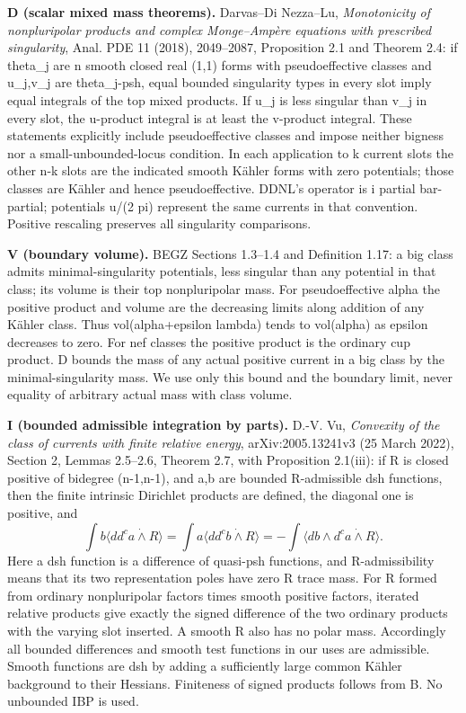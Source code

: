 \documentclass[
]{article}
\begin{document}
\textbf{D (scalar mixed mass theorems).} Darvas--Di Nezza--Lu,
\emph{Monotonicity of nonpluripolar products and complex Monge--Ampère
equations with prescribed singularity}, Anal. PDE 11 (2018), 2049--2087,
Proposition 2.1 and Theorem 2.4: if theta\_j are n smooth closed real
(1,1) forms with pseudoeffective classes and u\_j,v\_j are theta\_j-psh,
equal bounded singularity types in every slot imply equal integrals of
the top mixed products. If u\_j is less singular than v\_j in every
slot, the u-product integral is at least the v-product integral. These
statements explicitly include pseudoeffective classes and impose neither
bigness nor a small-unbounded-locus condition. In each application to k
current slots the other n-k slots are the indicated smooth Kähler forms
with zero potentials; those classes are Kähler and hence
pseudoeffective. DDNL's operator is i partial bar-partial; potentials
u/(2 pi) represent the same currents in that convention. Positive
rescaling preserves all singularity comparisons.

\textbf{V (boundary volume).} BEGZ Sections 1.3--1.4 and Definition
1.17: a big class admits minimal-singularity potentials, less singular
than any potential in that class; its volume is their top nonpluripolar
mass. For pseudoeffective alpha the positive product and volume are the
decreasing limits along addition of any Kähler class. Thus
vol(alpha+epsilon lambda) tends to vol(alpha) as epsilon decreases to
zero. For nef classes the positive product is the ordinary cup product.
D bounds the mass of any actual positive current in a big class by the
minimal-singularity mass. We use only this bound and the boundary limit,
never equality of arbitrary actual mass with class volume.

\textbf{I (bounded admissible integration by parts).} D.-V. Vu,
\emph{Convexity of the class of currents with finite relative energy},
arXiv:2005.13241v3 (25 March 2022), Section 2, Lemmas 2.5--2.6, Theorem
2.7, with Proposition 2.1(iii): if R is closed positive of bidegree
(n-1,n-1), and a,b are bounded R-admissible dsh functions, then the
finite intrinsic Dirichlet products are defined, the diagonal one is
positive, and \[
\int b\langle dd^ca\mathbin{\dot\wedge}R\rangle
=\int a\langle dd^cb\mathbin{\dot\wedge}R\rangle
=-\int\langle db\wedge d^ca\mathbin{\dot\wedge}R\rangle.\tag{I}
\] Here a dsh function is a difference of quasi-psh functions, and
R-admissibility means that its two representation poles have zero R
trace mass. For R formed from ordinary nonpluripolar factors times
smooth positive factors, iterated relative products give exactly the
signed difference of the two ordinary products with the varying slot
inserted. A smooth R also has no polar mass. Accordingly all bounded
differences and smooth test functions in our uses are admissible. Smooth
functions are dsh by adding a sufficiently large common Kähler
background to their Hessians. Finiteness of signed products follows from
B. No unbounded IBP is used.
\end{document}
